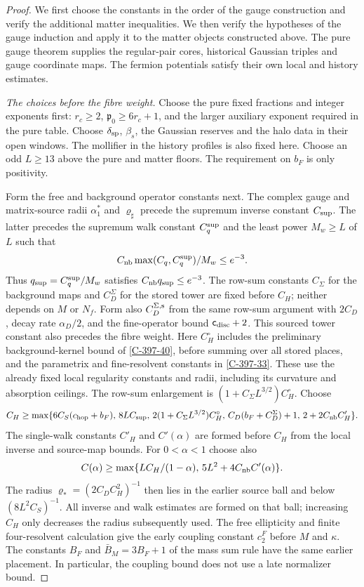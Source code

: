 \documentclass[11pt,letterpaper,reqno]{amsart}
\theoremstyle{definition}
\theoremstyle{remark}
\begin{document}
\begin{proof}
We first choose the constants in the order of the gauge
construction and verify the additional matter inequalities.
We then verify the hypotheses of the gauge induction and
apply it to the matter objects constructed above. The pure
gauge theorem supplies the regular-pair cores, historical
Gaussian triples and gauge coordinate maps. The fermion
potentials satisfy their own local and history estimates.

\emph{The choices before the fibre weight.}
Choose the pure fixed fractions and integer exponents first:
$r_c\ge2$, $\mathfrak p_0\ge6r_c+1$, and the larger auxiliary
exponent required in the pure table. Choose $\delta_{\rm sp}$,
$\beta_s$, the Gaussian reserves and the halo data in their
open windows. The mollifier in the history profiles is also
fixed here. Choose an odd $L\ge13$ above the pure and matter
floors. The requirement on $b_F$ is only positivity.

Form the free and background operator constants next.
The complex gauge and matrix-source radii $\alpha_1^*$ and
$\varrho_\sharp$ precede the supremum inverse constant
$C_{\rm sup}$. The latter precedes the supremum walk constant
$C_q^{\rm sup}$ and the least power $M_w\ge L$ of $L$ such that
\[
 C_{\rm nb}\max(C_q,C_q^{\rm sup})/M_w\le e^{-3}.
\]
Thus $q_{\rm sup}=C_q^{\rm sup}/M_w$ satisfies
$C_{\rm nb}q_{\rm sup}\le e^{-3}$.
The row-sum constants $C_\Sigma$ for the background maps
and $C_D^\Sigma$ for the stored tower are fixed before
$C_H$; neither depends on $M$ or $N_f$.
Form also $C_D^{\Sigma,{\rm s}}$ from
the same row-sum argument with $2C_D$, decay rate $\alpha_D/2$,
and the fine-operator bound $\mathsf c_{\rm disc}+2$.
This sourced tower constant also precedes the fibre weight.
Here $C_H^\circ$ includes the preliminary background-kernel
bound of \cref{C-397-40}, before summing over all stored
places, and the parametrix and fine-resolvent constants in
\cref{C-397-33}. These use the already fixed local regularity
constants and radii, including its curvature and absorption
ceilings. The row-sum enlargement is
$(1+C_\Sigma L^{3/2})C_H^\circ$. Choose
\[
 C_H\ge\max\{6C_S(c_{\rm hop}+b_F),\,8LC_{\rm sup},\,
 2(1+C_\Sigma L^{3/2})C_H^\circ,\,
 C_D(b_F+C_D^\Sigma)+1,\,2+2C_{\rm nb}C'_H\}.
\]
The single-walk constants $C'_H$ and $C'(\alpha)$ are formed
before $C_H$ from the local inverse and source-map bounds.
For $0<\alpha<1$ choose also
\[
 C(\alpha)\ge\max\{LC_H/(1-\alpha),\,
                         5L^2+4C_{\rm nb}C'(\alpha)\}.
\]
The radius $\varrho_*=(2C_DC_H^2)^{-1}$ then lies in the
earlier source ball and below $(8L^2C_S)^{-1}$.
All inverse and walk estimates are formed on that ball;
increasing $C_H$ only decreases the radius subsequently used.
The free ellipticity and finite four-resolvent calculation
give the early coupling constant $c_2^F$ before $M$ and
$\kappa$. The constants $B_F$ and $\bar B_M=3B_F+1$ of the
mass sum rule have the same earlier placement. In particular,
the coupling bound does not use a late normalizer bound.


\end{proof}
\end{document}
